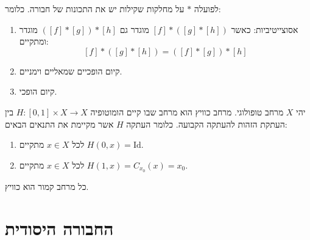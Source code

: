 \documentclass{tstextbook}
\begin{document}
\begin{proposition}
לפועלה \(*\) על מחלקות שקילות יש את התכונות של חבורה. כלומר:

  \begin{enumerate}
    \item אסוצייטיביות: כאשר \([f]*([g]*[h])\) מוגדר גם \(([f]*[g])*[h]\) מוגדר ומתקיים: 
$$[f]*([g]*[h])=([f]*[g])*[h]$$


    \item קיום הופכיים שמאליים וימניים. 


    \item קיום הופכי. 


  \end{enumerate}
\end{proposition}
\begin{definition}
יהי \(X\) מרחב טופולוגי. מרחב כוויץ הוא מרחב שבו קיים הומוטופיה \(H:[0,1]\times X\to X\) בין העתקת הזהות להעתקה הקבועה. כלומר העתקה \(H\) אשר מקיימת את התנאים הבאים:

  \begin{enumerate}
    \item לכל \(x \in X\) מתקיים \(H(0,x)=\mathrm{Id}\). 


    \item לכל \(x \in X\) מתקיים \(H(1,x)=C_{x_{0}}(x)=x_{0}\). 


  \end{enumerate}
\end{definition}
\begin{example}
כל מרחב קמור הוא כוויץ.

\end{example}
\section{החבורה היסודית}
\end{document}
